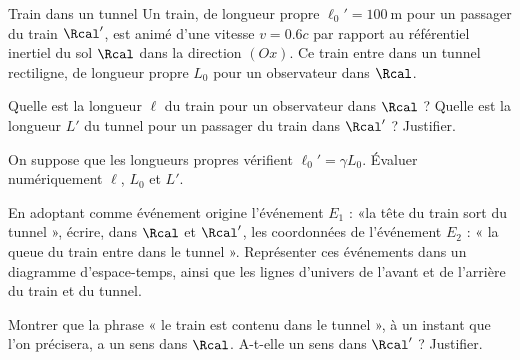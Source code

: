 \begin{exo}[PC][2][TD]{Train dans un tunnel}
Un train, de longueur propre $\ell_0'=100 \mathrm{~m}$ pour un passager du train $\Rcal^{\prime}$, est animé d'une vitesse $v=\num{0,6} c$ par rapport au référentiel inertiel du sol $\Rcal$ dans la direction $(Ox)$. Ce train entre dans un tunnel rectiligne, de longueur propre $L_0$ pour un observateur dans $\Rcal$.
\begin{quest}
  \item Quelle est la longueur $\ell$ du train pour un observateur dans $\Rcal$ ? Quelle est la longueur $L'$ du tunnel pour un passager du train dans $\Rcal^{\prime}$ ? Justifier.
  \item On suppose que les longueurs propres vérifient $\ell_0' = \gamma L_0$. Évaluer numériquement $\ell$, $L_0$ et $L'$. 
  \item En adoptant comme événement origine l'événement $E_1$ : «la tête du train sort du tunnel », écrire, dans $\Rcal$ et $\Rcal^{\prime}$, les coordonnées de l'événement $E_2$ : « la queue du train entre dans le tunnel ». Représenter ces événements dans un diagramme d'espace-temps, ainsi que les lignes d'univers de l'avant  et de l'arrière  du train et du tunnel. 
  \item Montrer que la phrase « le train est contenu dans le tunnel », à un instant que l'on précisera, a un sens dans $\Rcal$. A-t-elle un sens dans $\Rcal'$ ? Justifier.
\end{quest}
\end{exo}


